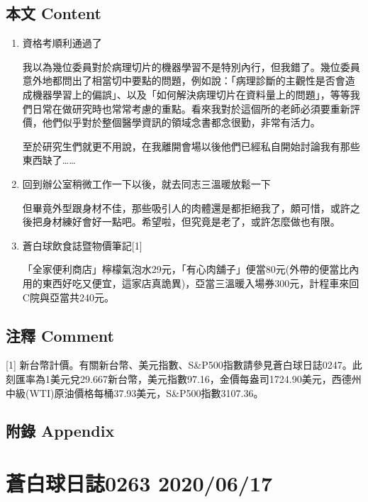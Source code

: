 \documentclass[
]{article}
\begin{document}
\hypertarget{ux672cux6587-content-13}{%
\subsection{本文 Content}\label{ux672cux6587-content-13}}

\begin{enumerate}
\def\labelenumi{\arabic{enumi}.}
\item
  資格考順利通過了

  我以為幾位委員對於病理切片的機器學習不是特別內行，但我錯了。幾位委員意外地都問出了相當切中要點的問題，例如說：「病理診斷的主觀性是否會造成機器學習上的偏誤」、以及「如何解決病理切片在資料量上的問題」，等等我們日常在做研究時也常常考慮的重點。看來我對於這個所的老師必須要重新評價，他們似乎對於整個醫學資訊的領域念書都念很勤，非常有活力。

  至於研究生們就更不用說，在我離開會場以後他們已經私自開始討論我有那些東西缺了\ldots\ldots{}
\item
  回到辦公室稍微工作一下以後，就去同志三溫暖放鬆一下

  但畢竟外型跟身材不佳，那些吸引人的肉體還是都拒絕我了，頗可惜，或許之後把身材練好會好一點吧。希望啦，但究竟是老了，或許怎麼做也有限。
\item
  蒼白球飲食誌暨物價筆記{[}1{]}

  「全家便利商店」檸檬氣泡水29元，「有心肉舖子」便當80元(外帶的便當比內用的東西好吃又便宜，這家店真詭異)，亞當三溫暖入場券300元，計程車來回C院與亞當共240元。
\end{enumerate}

\hypertarget{ux6ce8ux91cb-comment-13}{%
\subsection{注釋 Comment}\label{ux6ce8ux91cb-comment-13}}

{[}1{]}
新台幣計價。有關新台幣、美元指數、S\&P500指數請參見蒼白球日誌0247。此刻匯率為1美元兌29.667新台幣，美元指數97.16，金價每盎司1724.90美元，西德州中級(WTI)原油價格每桶37.93美元，S\&P500指數3107.36。

\hypertarget{ux9644ux9304-appendix-13}{%
\subsection{附錄 Appendix}\label{ux9644ux9304-appendix-13}}

\hypertarget{ux84bcux767dux7403ux65e5ux8a8c0263-20200617}{%
\section{蒼白球日誌0263
2020/06/17}\label{ux84bcux767dux7403ux65e5ux8a8c0263-20200617}}
\end{document}
